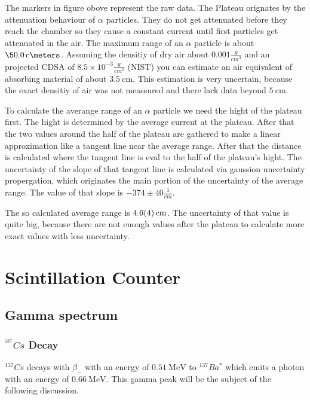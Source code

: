 \documentclass[12pt,twoside,a4paper]{scrartcl}
\begin{document}
    The markers in figure obove represent the raw data. The Plateau orignates by
    the attenuation behaviour of $\alpha$ particles. They do not get attenuated
    before they reach the chamber so they cause a constant current until first particles
    get attenuated in the air. The maximum range of an $\alpha$ particle is about
    $\SI{\5.0}{\centi\meters}$. Assuming the densitiy of dry air about $0.001\frac{g}{cm^3}$
    and an projected CDSA of $8.5\times10^{-3}\frac{g}{cm^2}$ (NIST) you can estimate an
    air equivalent of absorbing material of about $\SI{3.5}{\centi\meter}$. This
    estimation is very uncertain, because the exact densitiy of air was not meassured and
    there lack data beyond $\SI{5}{\centi\meter}$.

    To calculate the averange range of an $\alpha$ particle we need the hight of the plateau
    first. The hight is determined by the average current at the plateau. After that
    the two values around the half of the plateau are gathered to make a linear
    approximation like a tangent line near the average range. After that the distance
    is calculated where the tangent line is eval to the half of the plateau's hight.
    The uncertainty of the slope of that tangent line is calculated via gaussion
    uncertainty propergation, which originates the main portion of the uncertainty
    of the average range. The value of that slope is $-374 \pm 40\frac{1}{cm}$.

    The so calculated average range is $\SI{4.6 \pm 0.4}{\centi\meter}$. The uncertainty
    of that value is quite big, because there are not enough values after the plateau
    to calculate more exact values with less uncertainty.

\section{Scintillation Counter}
	\subsection{Gamma spectrum}
	\label{Gamma}
        \subsubsection{$^{^137}Cs$ Decay}
        $^{137} Cs$ decays with $\beta_-$ with an energy of $\SI{0.51}{\mega\electronvolt}$ to
        $^{137}Ba^*$ which emits a photon with an energy of $\SI{0.66}{\mega\electronvolt}$.
        This gamma peak will be the subject of the following discussion.
\end{document}
